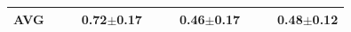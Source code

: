 \documentclass[encoding=utf8,british]{tumphthesis}
\begin{document}
\begin{table}[H]
\begin{subtable}{1\textwidth}
{\begin{tabular}{|l|llr|llr|llr|}
\textbf{AVG}                             &                                                      &                                                       & \textbf{0.72$\pm$0.17}                           &                                                      &                                                       & \textbf{0.46$\pm$0.17}                           &                                                      &                                                       & \textbf{0.48$\pm$0.12}                          
\\ \hline
\end{tabular}}
\end{subtable}

\bigskip
\begin{subtable}{1\textwidth}
\label{tab:benchmark-radmon-alCSSC}


\end{subtable}
\end{table}
\end{document}
